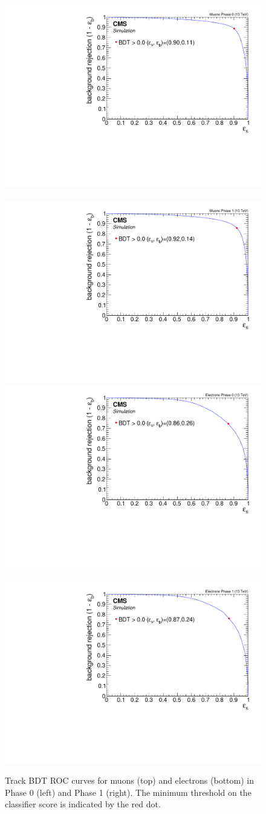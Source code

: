 \begin{figure}[!htb]
\centering
\includegraphics[width=0.48\linewidth]{plots/track_bdt/roc_Tracks_Muons_Phase_0.pdf} \,
\includegraphics[width=0.48\linewidth]{plots/track_bdt/roc_Tracks_Muons_Phase_1.pdf}  \\
\includegraphics[width=0.48\linewidth]{plots/track_bdt/roc_Tracks_Electrons_Phase_0.pdf} \,
\includegraphics[width=0.48\linewidth]{plots/track_bdt/roc_Tracks_Electrons_Phase_1.pdf} \\
\caption[Track BDT ROC curves]{Track BDT ROC curves for muons (top) and electrons (bottom) in Phase 0 (left) and Phase 1 (right). The minimum threshold on the classifier score is indicated by the red dot.}
\label{fig:track-bdt-roc}
\end{figure}

